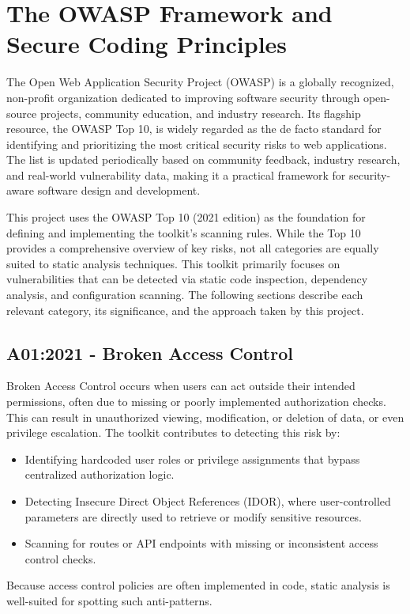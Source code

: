 \chapter{The OWASP Framework and Secure Coding Principles}
\label{chap:owasp}
\setlength{\parskip}{1em}

The Open Web Application Security Project (OWASP) is a globally recognized, non-profit organization dedicated to improving software security through open-source projects, community education, and industry research. Its flagship resource, the OWASP Top 10, is widely regarded as the de facto standard for identifying and prioritizing the most critical security risks to web applications. The list is updated periodically based on community feedback, industry research, and real-world vulnerability data, making it a practical framework for security-aware software design and development.

This project uses the OWASP Top 10 (2021 edition) as the foundation for defining and implementing the toolkit's scanning rules. While the Top 10 provides a comprehensive overview of key risks, not all categories are equally suited to static analysis techniques. This toolkit primarily focuses on vulnerabilities that can be detected via static code inspection, dependency analysis, and configuration scanning. The following sections describe each relevant category, its significance, and the approach taken by this project.

\section{A01:2021 - Broken Access Control}
Broken Access Control occurs when users can act outside their intended permissions, often due to missing or poorly implemented authorization checks. This can result in unauthorized viewing, modification, or deletion of data, or even privilege escalation.
The toolkit contributes to detecting this risk by:
\begin{itemize}
    \item Identifying hardcoded user roles or privilege assignments that bypass centralized authorization logic.
    \item Detecting Insecure Direct Object References (IDOR), where user-controlled parameters are directly used to retrieve or modify sensitive resources.
    \item Scanning for routes or API endpoints with missing or inconsistent access control checks.
\end{itemize}
Because access control policies are often implemented in code, static analysis is well-suited for spotting such anti-patterns.

